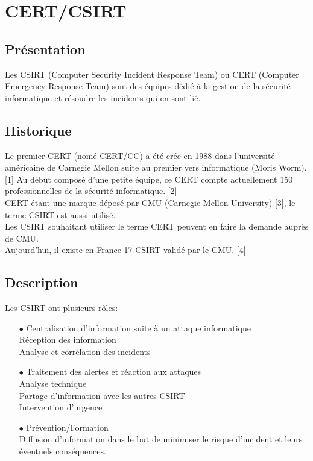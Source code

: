 \section{CERT/CSIRT}
\thispagestyle{plain}
\subsection{Présentation}
Les CSIRT (Computer Security Incident Response Team) ou CERT (Computer Emergency Response Team) sont des équipes dédié à la gestion de la sécurité informatique et résoudre les incidents qui en sont lié.

\subsection{Historique}
Le premier CERT (nomé CERT/CC)  a été crée en 1988 dans l’université américaine de Carnegie Mellon suite au premier vers informatique (Moris Worm). [1]
Au début composé d’une petite équipe, ce CERT compte actuellement 150 professionnelles de la sécurité informatique. [2]\\

CERT étant une marque déposé par CMU (Carnegie Mellon University) [3], le terme CSIRT est aussi utilisé.\\

Les CSIRT souhaitant utiliser le terme CERT peuvent en faire la demande auprès de CMU.\\
Aujourd’hui, il existe en France 17 CSIRT validé par le CMU. [4]\\

\subsection{Description}
Les CSIRT ont plusieurs rôles:
\begin{itemize}
\item [$\bullet$] Centralisation d’information suite à un attaque informatique\\
\subitem [$\bullet$] Réception des information\\
\subitem [$\bullet$] Analyse et corrélation des incidents\\
\item [$\bullet$] Traitement des alertes et réaction aux attaques\\
\subitem [$\bullet$] Analyse technique\\
\subitem [$\bullet$] Partage d’information avec les autres CSIRT\\
\subitem [$\bullet$] Intervention d’urgence\\
\item [$\bullet$] Prévention/Formation\\
\subitem [$\bullet$] Diffusion d’information dans le but de minimiser le risque d’incident et leurs éventuels conséquences.\\
\end{itemize}
